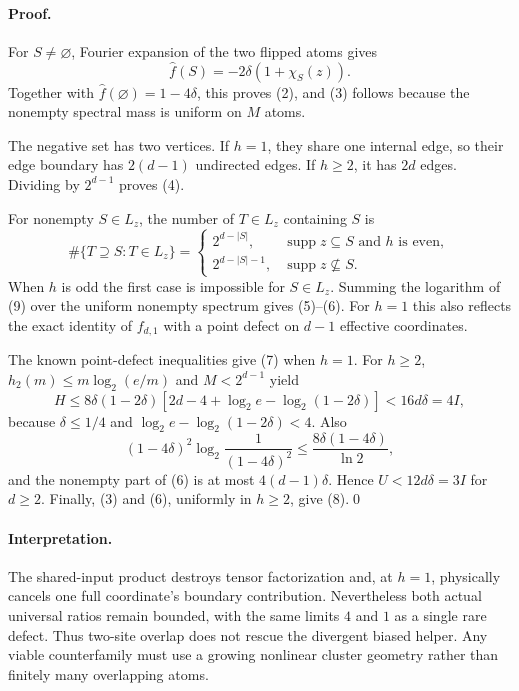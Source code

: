 \paragraph{Proof.}
For $S\ne\varnothing$, Fourier expansion of the two flipped atoms gives
\[
 \widehat f(S)=-2\delta(1+\chi_S(z)).
\]
Together with $\widehat f(\varnothing)=1-4\delta$, this proves (2), and
(3) follows because the nonempty spectral mass is uniform on $M$ atoms.

The negative set has two vertices.  If $h=1$, they share one internal edge,
so their edge boundary has $2(d-1)$ undirected edges.  If $h\ge2$, it has
$2d$ edges.  Dividing by $2^{d-1}$ proves (4).

For nonempty $S\in L_z$, the number of $T\in L_z$ containing $S$ is
\[
 \#\{T\supseteq S:T\in L_z\}=
 \begin{cases}
 2^{d-|S|},&\operatorname{supp}z\subseteq S\text{ and }h\text{ is even},\\
 2^{d-|S|-1},&\operatorname{supp}z\not\subseteq S.
 \end{cases}                                                   \tag{9}
\]
When $h$ is odd the first case is impossible for $S\in L_z$.  Summing the
logarithm of (9) over the uniform nonempty spectrum gives (5)--(6).  For
$h=1$ this also reflects the exact identity of $f_{d,1}$ with a point defect
on $d-1$ effective coordinates.

The known point-defect inequalities give (7) when $h=1$.  For $h\ge2$,
$h_2(m)\le m\log_2(e/m)$ and $M<2^{d-1}$ yield
\[
 H\le8\delta(1-2\delta)
 \left[2d-4+\log_2e-\log_2(1-2\delta)\right]<16d\delta=4I,
\]
because $\delta\le1/4$ and
$\log_2e-\log_2(1-2\delta)<4$.  Also
\[
 (1-4\delta)^2\log_2\frac1{(1-4\delta)^2}
 \le\frac{8\delta(1-4\delta)}{\ln2},
\]
and the nonempty part of (6) is at most $4(d-1)\delta$.  Hence
$U<12d\delta=3I$ for $d\ge2$.  Finally, (3) and (6), uniformly in $h\ge2$,
give (8).\qed

\paragraph{Interpretation.}
The shared-input product destroys tensor factorization and, at $h=1$,
physically cancels one full coordinate's boundary contribution.  Nevertheless
both actual universal ratios remain bounded, with the same limits $4$ and
$1$ as a single rare defect.  Thus two-site overlap does not rescue the
divergent biased helper.  Any viable counterfamily must use a growing
nonlinear cluster geometry rather than finitely many overlapping atoms.
